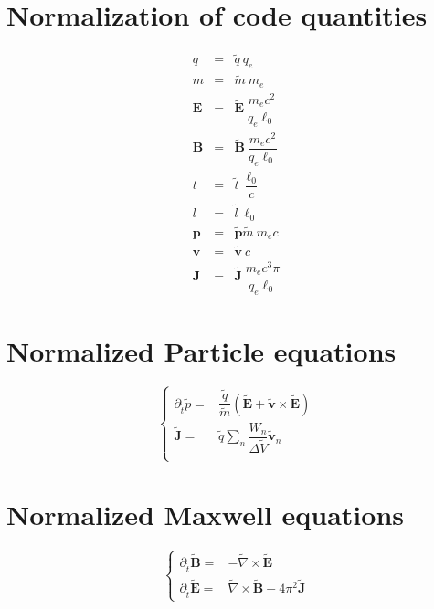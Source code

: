 \documentclass[11pt,a4paper]{report}
\begin{document}
\section*{Normalization of code quantities}
\begin{eqnarray*}
q &=& \widetilde{q} \: q_e\\
m &=& \widetilde{m} \: m_e\\
\mathbf{E} &=& \widetilde{\mathbf{E}} \: \dfrac{m_e c^2}{q_e \ell_0} \\
\mathbf{B} &=& \widetilde{\mathbf{B}} \: \dfrac{m_e c^2}{q_e \ell_0} \\
t &=& \widetilde{t} \: \dfrac{\ell_0}{c} \\
l &=& \widetilde{l} \: \ell_0 \\
\mathbf{p} &=& \widetilde{\mathbf{p}} \widetilde{m} \: m_e c \\
\mathbf{v} &=& \widetilde{\mathbf{v}} \: c \\
\mathbf{J} &=& \widetilde{\mathbf{J}} \: \dfrac{m_e c^3 \pi}{q_e \ell_0}
\end{eqnarray*}
\section*{Normalized Particle equations}
$$
\begin{cases}
    \partial_{\widetilde{t}} \widetilde{p} = & \dfrac{\widetilde{q}}{\widetilde{m}} \left({\widetilde{\mathbf{E}} + \widetilde{\mathbf{v}} \times \widetilde{\mathbf{E}}}\right) \\
   \widetilde{\mathbf{J}} = & \widetilde{q} \sum_n{\dfrac{W_n}{\Delta \widetilde{V}} \widetilde{\mathbf{v}}_n} \\
\end{cases}
$$

\section*{Normalized Maxwell equations}
$$
\begin{cases}
    \partial_{\widetilde{t}} \widetilde{\mathbf{B}} = & - \widetilde{\nabla} \times \widetilde{\mathbf{E}} \\
    \partial_{\widetilde{t}} \widetilde{\mathbf{E}} = & \widetilde{\nabla} \times \widetilde{\mathbf{B}} - 4\pi^2 \widetilde{\mathbf{J}}
\end{cases}
$$
\end{document}

